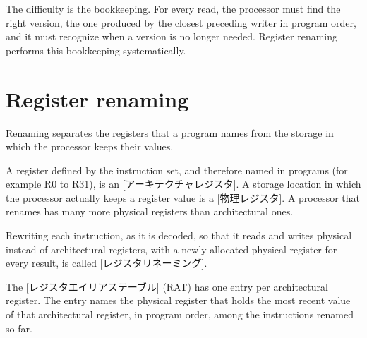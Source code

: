\documentclass[../main.tex]{subfiles}
\begin{document}
The difficulty is the bookkeeping.  For every read, the processor must find
the right version, the one produced by the closest preceding writer in
program order, and it must recognize when a version is no longer needed.
Register renaming performs this bookkeeping systematically.

\section{Register renaming}
\label{sec:l06-renaming}

Renaming separates the registers that a program names from the storage in
which the processor keeps their values.

\begin{definition}
  \label{def:l06-registers}
  A register defined by the instruction set, and therefore named in
  programs (for example R0 to R31), is an [アーキテクチャレジスタ].  A storage location in which the
  processor actually keeps a register value is a [物理レジスタ].  A processor that renames has many more
  physical registers than architectural ones.
\end{definition}

\begin{definition}
  \label{def:l06-renaming}
  Rewriting each instruction, as it is decoded, so that it reads and writes
  physical instead of architectural registers, with a newly allocated
  physical register for every result, is called [レジスタリネーミング].
\end{definition}

\begin{definition}
  \label{def:l06-rat}
  The [レジスタエイリアステーブル]%
   (RAT) has one entry per
  architectural register.  The entry names the physical register that holds
  the most recent value of that architectural register, in program order,
  among the instructions renamed so far.
\end{definition}
\end{document}
